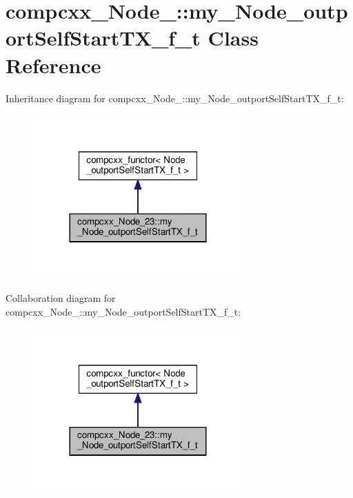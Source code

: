 \hypertarget{classcompcxx__Node__23_1_1my__Node__outportSelfStartTX__f__t}{}\section{compcxx\+\_\+\+Node\+\_\+:\+:my\+\_\+\+Node\+\_\+outport\+Self\+Start\+T\+X\+\_\+f\+\_\+t Class Reference}
\label{classcompcxx__Node__23_1_1my__Node__outportSelfStartTX__f__t}


Inheritance diagram for compcxx\+\_\+\+Node\+\_\+:\+:my\+\_\+\+Node\+\_\+outport\+Self\+Start\+T\+X\+\_\+f\+\_\+t\+:\nopagebreak
\begin{figure}[H]
\begin{center}
\leavevmode
\includegraphics[width=228pt]{classcompcxx__Node__23_1_1my__Node__outportSelfStartTX__f__t__inherit__graph}
\end{center}
\end{figure}


Collaboration diagram for compcxx\+\_\+\+Node\+\_\+:\+:my\+\_\+\+Node\+\_\+outport\+Self\+Start\+T\+X\+\_\+f\+\_\+t\+:\nopagebreak
\begin{figure}[H]
\begin{center}
\leavevmode
\includegraphics[width=228pt]{classcompcxx__Node__23_1_1my__Node__outportSelfStartTX__f__t__coll__graph}
\end{center}
\end{figure}
